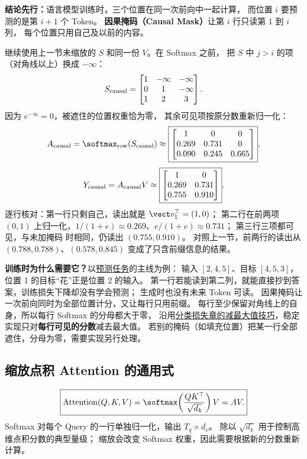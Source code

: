 \textbf{结论先行：}语言模型训练时，三个位置在同一次前向中一起计算，
而位置 $i$ 要预测的是第 $i+1$ 个 Token。
\textbf{因果掩码（Causal Mask）}让第 $i$ 行只读第 $1$ 到 $i$ 列，
每个位置只用自己及以前的内容。

继续使用上一节未缩放的 $S$ 和同一份 $V$。在 Softmax 之前，
把 $S$ 中 $j>i$ 的项（对角线以上）换成 $-\infty$：
\[
S_{\rm causal}=\begin{bmatrix}
1&-\infty&-\infty\\
0&1&-\infty\\
1&2&3
\end{bmatrix}.
\]
因为 $e^{-\infty}=0$，被遮住的位置权重恰为零，
其余可见项按原分数重新归一化：
\[
A_{\rm causal}=\softmax_{\rm row}(S_{\rm causal})
\approx\boxed{\begin{bmatrix}
1&0&0\\
0.269&0.731&0\\
0.090&0.245&0.665
\end{bmatrix}},
\]
\[
Y_{\rm causal}=A_{\rm causal}V
\approx\boxed{\begin{bmatrix}
1&0\\
0.269&0.731\\
0.755&0.910
\end{bmatrix}}.
\]
逐行核对：第一行只剩自己，读出就是 $\vect v_1^\top=(1,0)$；
第二行在前两项 $(0,1)$ 上归一化，$1/(1+e)\approx0.269$、$e/(1+e)\approx0.731$；
第三行三项都可见，与未加掩码 时相同，仍读出 $(0.755,0.910)$。
对照上一节，前两行的读出从 $(0.788,0.788)$、$(0.578,0.845)$
变成了只含前缀信息的结果。

\textbf{训练时为什么需要它？}以\hyperref[intro:20b-task-contract]{预测任务}的主线为例：
输入 $[2,4,5]$、目标 $[4,5,3]$，位置 1 的目标“花”正是位置 2 的输入。
第一行若能读到第二列，就能直接抄到答案，训练损失下降却没有学会预测；
生成时也没有未来 Token 可读。
因果掩码让一次前向同时为全部位置计分，又让每行只用前缀。
每行至少保留对角线上的自身，所以每行 Softmax 的分母都大于零，
沿用\hyperref[intro:20c-classification-loss]{分类损失章的减最大值技巧}，稳定实现只对\textbf{每行可见的分数}减去最大值。
若别的掩码（如填充位置）把某一行全部遮住，分母为零，需要实现另行处理。


\subsection{缩放点积 Attention 的通用式}
\begin{equation}
\boxed{\operatorname{Attention}(Q,K,V)
=\softmax\!\left(\frac{QK^\top}{\sqrt{d_k}}\right)V=AV.}
\label{eq:attention-transformer}
\end{equation}
\label{eq:multi-query-attention}
Softmax 对每个 Query 的一行单独归一化，输出 $T_q\times d_v$。
除以 $\sqrt{d_k}$ 用于控制高维点积分数的典型量级；
缩放会改变 Softmax 权重，因此需要根据新的分数重新计算。

